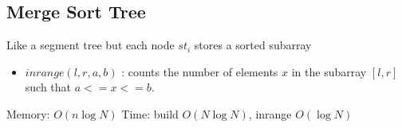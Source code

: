 \subsection{Merge Sort Tree}

Like a segment tree but each node $st_i$ stores a sorted subarray


\begin{itemize}
  \item \textbf{$inrange(l, r, a, b)$} : counts the number of elements $x$ in the subarray $[l, r]$ such that $ a <= x <= b$.
\end{itemize}

Memory: $O(n \log{N})$
Time: build $O(N \log{N})$, inrange $O(\log{N})$

